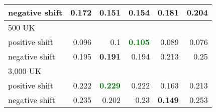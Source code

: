 \begin{table}[!ht]
{\begin{tabular}{lrrrrr}
negative shift            & \multicolumn{1}{r|}{0.172}          & \textbf{\textcolor{BrickRed}{0.151}}                                                      & \multicolumn{1}{r|}{0.154}                                                   & 0.181                                                                & 0.204                                                                        \\ \midrule
\multicolumn{6}{l}{500 UK}                                                                                                                                                                                                                                                                                                                                            \\ \midrule
positive shift           & \multicolumn{1}{r|}{0.096}          & 0.1                                                                 & \multicolumn{1}{r|}{\textbf{\textcolor{Green}{0.105}}  }                                          & 0.089                                                                & 0.076                                                                        \\
negative shift            & \multicolumn{1}{r|}{0.195}          & \textbf{\textcolor{BrickRed}{0.191}}                                                       & \multicolumn{1}{r|}{0.194}                                                   & 0.213                                                                & 0.25                                                                         \\ \midrule
\multicolumn{6}{l}{3,000 UK}                                                                                                                                                                                                                                                                                                                                           \\ \midrule
positive shift           & \multicolumn{1}{r|}{0.222}          & \textbf{\textcolor{Green}{0.229}}                                                        & \multicolumn{1}{r|}{0.222}                                                   & 0.163                                                                & 0.213                                                                        \\
negative shift            & \multicolumn{1}{r|}{0.235}          & 0.202                                                               & \multicolumn{1}{r|}{0.23}                                                    & \textbf{\textcolor{BrickRed}{0.149}}                                                          & 0.253                                                                        \\ \bottomrule

\end{tabular}}
\end{table}

